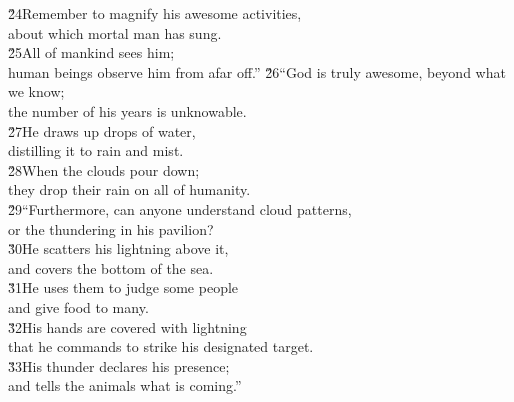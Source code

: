 \begin{poetry}
\poeml \v{24}Remember to magnify his awesome activities, \\
\poemll    about which mortal man has sung. \\
\poeml \v{25}All of mankind sees him; \\
\poemll    human beings observe him from afar off.''
\poeml \v{26}``God is truly awesome, beyond what we know; \\
\poemll    the number of his years is unknowable. \\
\poeml \v{27}He draws up drops of water, \\
\poemll    distilling it to rain and mist. \\
\poeml \v{28}When the clouds pour down; \\
\poemll    they drop their rain on all of humanity. \\
\poeml \v{29}``Furthermore, can anyone understand cloud patterns, \\
\poemll    or the thundering in his pavilion? \\
\poeml \v{30}He scatters his lightning above it, \\
\poemll    and covers the bottom of the sea. \\
\poeml \v{31}He uses them to judge some people \\
\poemll    and give food to many. \\
\poeml \v{32}His hands are covered with lightning \\
\poemll    that he commands to strike his designated target. \\
\poeml \v{33}His thunder declares his presence; \\
\poemll    and tells the animals what is coming.''
\end{poetry}

